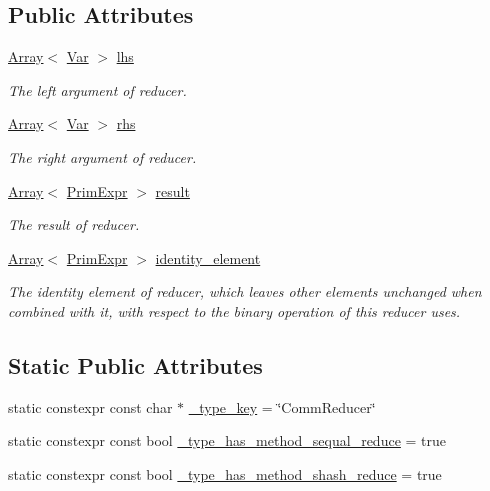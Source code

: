 \subsection*{Public Attributes}
\begin{DoxyCompactItemize}
\item 
\hyperlink{classtvm_1_1Array}{Array}$<$ \hyperlink{classtvm_1_1tir_1_1Var}{Var} $>$ \hyperlink{classtvm_1_1tir_1_1CommReducerNode_a3fc76ed5cf3a73c803ce1c74dedf7429}{lhs}
\begin{DoxyCompactList}\small\item\em The left argument of reducer. \end{DoxyCompactList}\item 
\hyperlink{classtvm_1_1Array}{Array}$<$ \hyperlink{classtvm_1_1tir_1_1Var}{Var} $>$ \hyperlink{classtvm_1_1tir_1_1CommReducerNode_a2902b0d55dd823febc6941fae9f32337}{rhs}
\begin{DoxyCompactList}\small\item\em The right argument of reducer. \end{DoxyCompactList}\item 
\hyperlink{classtvm_1_1Array}{Array}$<$ \hyperlink{classtvm_1_1PrimExpr}{Prim\+Expr} $>$ \hyperlink{classtvm_1_1tir_1_1CommReducerNode_a7030917568a088215da423fc56882814}{result}
\begin{DoxyCompactList}\small\item\em The result of reducer. \end{DoxyCompactList}\item 
\hyperlink{classtvm_1_1Array}{Array}$<$ \hyperlink{classtvm_1_1PrimExpr}{Prim\+Expr} $>$ \hyperlink{classtvm_1_1tir_1_1CommReducerNode_ad8cbb3f8e12db0a2a814c1cbde2e8b9c}{identity\+\_\+element}
\begin{DoxyCompactList}\small\item\em The identity element of reducer, which leaves other elements unchanged when combined with it, with respect to the binary operation of this reducer uses. \end{DoxyCompactList}\end{DoxyCompactItemize}
\subsection*{Static Public Attributes}
\begin{DoxyCompactItemize}
\item 
static constexpr const char $\ast$ \hyperlink{classtvm_1_1tir_1_1CommReducerNode_a6018d3a9bcc12cc4b1705dc30161f917}{\+\_\+type\+\_\+key} = \char`\"{}Comm\+Reducer\char`\"{}
\item 
static constexpr const bool \hyperlink{classtvm_1_1tir_1_1CommReducerNode_a652ae6d8ae6bbc677d2a1dbfffe6d034}{\+\_\+type\+\_\+has\+\_\+method\+\_\+sequal\+\_\+reduce} = true
\item 
static constexpr const bool \hyperlink{classtvm_1_1tir_1_1CommReducerNode_a17818bc2255e3900d4f5cd12a3605ed8}{\+\_\+type\+\_\+has\+\_\+method\+\_\+shash\+\_\+reduce} = true
\end{DoxyCompactItemize}


